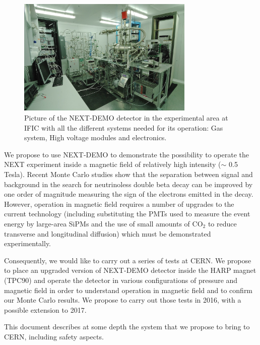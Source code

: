 \begin{figure}
\centering
\includegraphics[width=0.75\textwidth]{img/NextDemo_cleanroom.jpg}
\caption{Picture of the NEXT-DEMO detector in the experimental area at IFIC with all the different systems needed for its operation: Gas system, High voltage modules and electronics.} \label{fig:cleanroom}
\end{figure}

We propose to use NEXT-DEMO to demonstrate the possibility to operate the NEXT experiment inside a magnetic field of relatively high intensity ($\sim$ 0.5 Tesla). Recent Monte Carlo studies show that the separation between signal and background in the search for neutrinoless double beta decay can be improved by one order of magnitude measuring the sign of the electrons emitted in the decay. However, operation in magnetic field requires a number of upgrades to the current technology (including substituting the PMTs used to measure the event energy by large-area SiPMs and the use of small amounts of CO$_2$ to reduce transverse and longitudinal diffusion) which must be demonstrated experimentally.  

Consequently, we would like to carry out a series of tests at CERN. We propose to place an upgraded version of  NEXT-DEMO detector inside the HARP magnet (TPC90) and operate the detector in various configurations of pressure and magnetic field in order to understand operation in magnetic field and to confirm our Monte Carlo results.
We propose to carry out those tests in 2016, with a possible extension to 2017. 

This document describes at some depth the system that we propose to bring to CERN, including safety aspects. 
